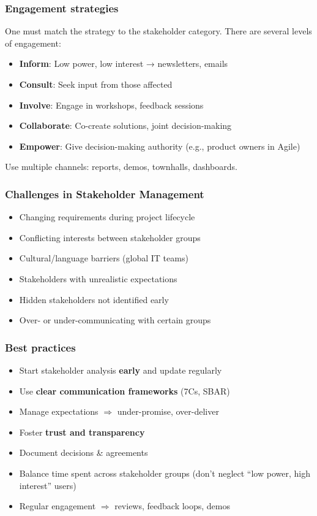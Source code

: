 \subsubsection{Engagement strategies}

\indent 

One must match the strategy to the stakeholder category. There are several levels of engagement:

\begin{itemize}
    \item \textbf{Inform}: Low power, low interest → newsletters, emails
    \item \textbf{Consult}: Seek input from those affected
    \item \textbf{Involve}: Engage in workshops, feedback sessions
    \item \textbf{Collaborate}: Co-create solutions, joint decision-making
    \item \textbf{Empower}: Give decision-making authority (e.g., product owners in Agile)
\end{itemize}

Use multiple channels: reports, demos, townhalls, dashboards.

\subsubsection{Challenges in Stakeholder Management}

\begin{itemize}
    \item Changing requirements during project lifecycle
    \item Conflicting interests between stakeholder groups
    \item Cultural/language barriers (global IT teams)
    \item Stakeholders with unrealistic expectations
    \item Hidden stakeholders not identified early
    \item Over- or under-communicating with certain groups
\end{itemize}

\subsubsection{Best practices}

\begin{itemize}
    \item Start stakeholder analysis \textbf{early} and update regularly
    \item Use \textbf{clear communication frameworks} (7Cs, SBAR)
    \item Manage expectations $\Longrightarrow$ under-promise, over-deliver
    \item Foster \textbf{trust and transparency}
    \item Document decisions \& agreements
    \item Balance time spent across stakeholder groups (don’t neglect “low power, high interest” users)
    \item Regular engagement $\Longrightarrow$ reviews, feedback loops, demos
\end{itemize}

